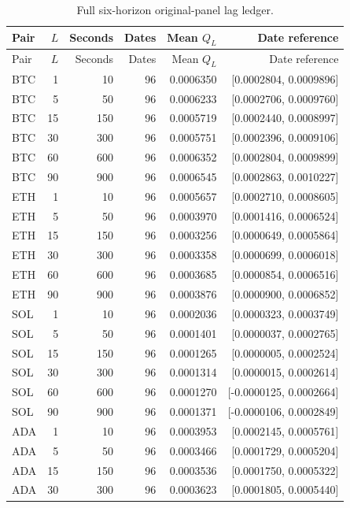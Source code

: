 \documentclass[10pt]{article}
\begin{document}
\small\setlength{\tabcolsep}{3pt}
\begin{longtable}{lrrrrr}
\caption{Full six-horizon original-panel lag ledger.}\label{tab:full_lag_intervals}\\
\toprule
Pair & $L$ & Seconds & Dates & Mean $Q_L$ & Date reference \\\midrule\endfirsthead
\toprule
Pair & $L$ & Seconds & Dates & Mean $Q_L$ & Date reference \\\midrule\endhead
BTC & 1 & 10 & 96 & 0.0006350 & [0.0002804, 0.0009896] \\
BTC & 5 & 50 & 96 & 0.0006233 & [0.0002706, 0.0009760] \\
BTC & 15 & 150 & 96 & 0.0005719 & [0.0002440, 0.0008997] \\
BTC & 30 & 300 & 96 & 0.0005751 & [0.0002396, 0.0009106] \\
BTC & 60 & 600 & 96 & 0.0006352 & [0.0002804, 0.0009899] \\
BTC & 90 & 900 & 96 & 0.0006545 & [0.0002863, 0.0010227] \\
ETH & 1 & 10 & 96 & 0.0005657 & [0.0002710, 0.0008605] \\
ETH & 5 & 50 & 96 & 0.0003970 & [0.0001416, 0.0006524] \\
ETH & 15 & 150 & 96 & 0.0003256 & [0.0000649, 0.0005864] \\
ETH & 30 & 300 & 96 & 0.0003358 & [0.0000699, 0.0006018] \\
ETH & 60 & 600 & 96 & 0.0003685 & [0.0000854, 0.0006516] \\
ETH & 90 & 900 & 96 & 0.0003876 & [0.0000900, 0.0006852] \\
SOL & 1 & 10 & 96 & 0.0002036 & [0.0000323, 0.0003749] \\
SOL & 5 & 50 & 96 & 0.0001401 & [0.0000037, 0.0002765] \\
SOL & 15 & 150 & 96 & 0.0001265 & [0.0000005, 0.0002524] \\
SOL & 30 & 300 & 96 & 0.0001314 & [0.0000015, 0.0002614] \\
SOL & 60 & 600 & 96 & 0.0001270 & [-0.0000125, 0.0002664] \\
SOL & 90 & 900 & 96 & 0.0001371 & [-0.0000106, 0.0002849] \\
ADA & 1 & 10 & 96 & 0.0003953 & [0.0002145, 0.0005761] \\
ADA & 5 & 50 & 96 & 0.0003466 & [0.0001729, 0.0005204] \\
ADA & 15 & 150 & 96 & 0.0003536 & [0.0001750, 0.0005322] \\
ADA & 30 & 300 & 96 & 0.0003623 & [0.0001805, 0.0005440] \\

\end{longtable}
\end{document}
